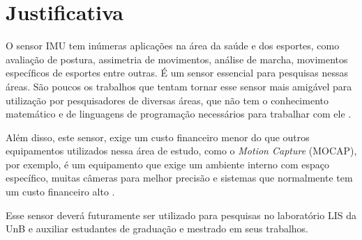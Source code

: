 \section{Justificativa}

O sensor IMU tem inúmeras aplicações na área da saúde e dos esportes, como avaliação de postura, assimetria de movimentos, análise de marcha, movimentos específicos de esportes entre outras. É um sensor essencial para pesquisas nessas áreas. São poucos os trabalhos que tentam tornar esse sensor mais amigável para utilização por pesquisadores de diversas áreas, que não tem o conhecimento matemático e de linguagens de programação necessários para trabalhar com ele \cite{ober2015}\cite{chang2016}. 

Além disso, este sensor, exige um custo financeiro menor do que outros equipamentos utilizados nessa área de estudo, como o \textit{Motion Capture} (MOCAP), por exemplo, é um equipamento que exige um ambiente interno com espaço específico, muitas câmeras para melhor precisão e sistemas que normalmente tem um custo financeiro alto \cite{chang2016}. 

Esse sensor deverá futuramente ser utilizado para  pesquisas no laboratório LIS da UnB e auxiliar estudantes de graduação e mestrado em seus trabalhos.